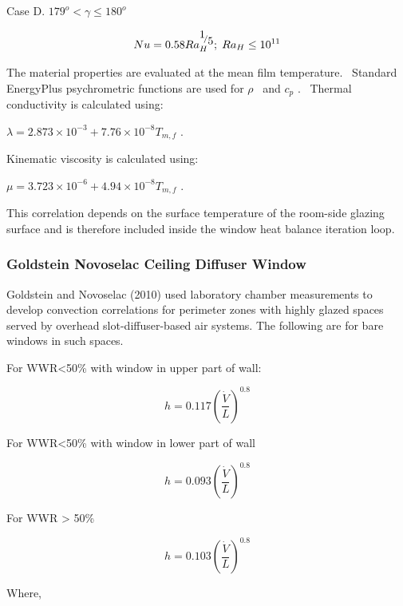 Case D. \(179^o < \gamma \leq 180^o\)

\begin{equation}
Nu = 0.58Ra_H^{{\raise0.7ex\hbox{1} \!\mathord{\left/ {\vphantom {1 5}}\right.}\!\lower0.7ex\hbox{5}}};\;R{a_H} \le {10^{11}}
\end{equation}

The material properties are evaluated at the mean film temperature.~ Standard EnergyPlus psychrometric functions are used for \(\rho\) ~and \({c_p}\) .~ Thermal conductivity is calculated using:

\(\lambda = 2.873 \times {10^{ - 3}} + 7.76 \times {10^{ - 8}}{T_{m,f}}\) .

Kinematic viscosity is calculated using:

\(\mu = 3.723 \times {10^{ - 6}} + 4.94 \times {10^{ - 8}}{T_{m,f}}\) .

This correlation depends on the surface temperature of the room-side glazing surface and is therefore included inside the window heat balance iteration loop.

\subsubsection{Goldstein Novoselac Ceiling Diffuser Window}\label{goldstein-novoselac-ceiling-diffuser-window}

Goldstein and Novoselac (2010) used laboratory chamber measurements to develop convection correlations for perimeter zones with highly glazed spaces served by overhead slot-diffuser-based air systems. The following are for bare windows in such spaces.

For WWR\textless{}50\% with window in upper part of wall:

\begin{equation}
h = 0.117{\left( {\frac{{\dot V}}{L}} \right)^{0.8}}
\end{equation}

For WWR\textless{}50\% with window in lower part of wall

\begin{equation}
h = 0.093{\left( {\frac{{\dot V}}{L}} \right)^{0.8}}
\end{equation}

For WWR \textgreater{} 50\%

\begin{equation}
h = 0.103{\left( {\frac{{\dot V}}{L}} \right)^{0.8}}
\end{equation}

Where,

